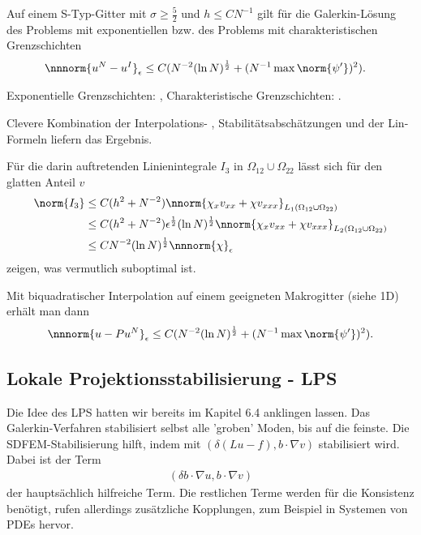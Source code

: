 \begin{satz}\label{thm:7-17}
  Auf einem S-Typ-Gitter mit $\sigma \geq \frac 52$ und $h \leq CN^{-1}$ gilt für die Galerkin-Lösung des Problems mit exponentiellen bzw. des Problems mit charakteristischen Grenzschichten
  \begin{align*}
    \nnnorm{u^{N} - u^{I}}_{\epsilon} &\leq C(N^{-2} (\ln N)^{\frac 12} + (N^{-1} \max \norm{\psi'})^{2}).  
  \end{align*}
\end{satz}
\begin{beweis}
Exponentielle Grenzschichten:  \cite{L_NMPDE},
Charakteristische Grenzschichten:  \cite{FL_NMPDE}.

Clevere Kombination der Interpolations- , Stabilitätsabschätzungen und der Lin-Formeln liefern das Ergebnis. 

Für die darin auftretenden Linienintegrale $I_{3}$ in $\Omega_{12} \cup \Omega_{22}$ lässt sich für den glatten Anteil $v$
\begin{align*}
  \norm{I_{3}} & \leq C (h^{2} + N^{-2})\nnorm{\chi_{x}v_{xx} + \chi v_{xxx}}_{L_{1}(\Omega_{12} \cup \Omega_{22})}\\
  &\leq C (h^{2} + N^{-2})\epsilon^{\frac 12} (\ln N)^{\frac 12} \nnorm{\chi_{x}v_{xx} + \chi v_{xxx}}_{L_{2}(\Omega_{12} \cup \Omega_{22})}\\
  &\leq C  N^{-2} (\ln N)^{\frac 12} \nnnorm{\chi}_{\epsilon}
\end{align*}
zeigen, was vermutlich suboptimal ist. 
\end{beweis}
Mit biquadratischer Interpolation auf einem geeigneten Makrogitter (siehe 1D) erhält man dann
\begin{align*}
  \nnnorm{u - Pu^{N}}_{\epsilon} \leq C (N^{-2}(\ln N)^{\frac 12} + (N^{-1} \max \norm{\psi'})^{2}). 
\end{align*}

\subsection{Lokale Projektionsstabilisierung - LPS}
\label{sec:lokale-proj-lps}

Die Idee des LPS hatten wir bereits im Kapitel 6.4 anklingen lassen. Das Galerkin-Verfahren stabilisiert selbst alle 'groben' Moden, bis auf die feinste. Die SDFEM-Stabilisierung hilft, indem mit $(\delta(Lu - f), b \cdot \nabla v)$ stabilisiert wird. Dabei ist der Term
\begin{align*}
(  \delta b \cdot \nabla u, b \cdot\nabla v)
\end{align*}
der hauptsächlich hilfreiche Term. Die restlichen Terme werden für die Konsistenz benötigt, rufen allerdings zusätzliche Kopplungen, zum Beispiel in Systemen von PDEs hervor. 

